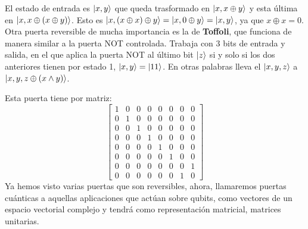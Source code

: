 \documentclass[a4paper]{article}
\numberwithin{equation}{section}
\begin{document}
\begin{figure}[h]
\centering
{}
\end{figure}

El estado de entrada es $\ket{x, y}$ que queda trasformado en $\ket{x, x\oplus y}$ y esta última en $\ket{x, x\oplus (x\oplus y)}$. Esto es $\ket{x, (x\oplus x) \oplus y} = \ket{x, 0\oplus y} = \ket{x, y}$, ya que $x\oplus x = 0$.\\
\linebreak
Otra puerta reversible de mucha importancia es la de \textbf{Toffoli},
que funciona de manera similar a la puerta NOT controlada. Trabaja con 3 bits de entrada y salida, en el que aplica la puerta NOT al último bit $\ket{z}$ si y solo si los dos anteriores tienen por estado 1, $\ket{x, y} = \ket{11}$. En otras palabras lleva el $\ket{x,y,z}$ a $\ket{x,y,z\oplus(x\wedge y)}$. \\
\begin{figure}[h]
\centering
{}
\end{figure}

Esta puerta tiene por matriz:
\begin{equation}
\begin{bmatrix}
1 & 0 & 0 & 0 & 0 & 0 & 0 & 0 \\
0 & 1 & 0 & 0 & 0 & 0 & 0 & 0 \\
0 & 0 & 1 & 0 & 0 & 0 & 0 & 0 \\
0 & 0 & 0 & 1 & 0 & 0 & 0 & 0 \\
0 & 0 & 0 & 0 & 1 & 0 & 0 & 0 \\
0 & 0 & 0 & 0 & 0 & 1 & 0 & 0 \\
0 & 0 & 0 & 0 & 0 & 0 & 0 & 1 \\
0 & 0 & 0 & 0 & 0 & 0 & 1 & 0
\end{bmatrix}
\end{equation}
Ya hemos visto varias puertas que son reversibles, ahora, llamaremos puertas cuánticas a aquellas aplicaciones que actúan sobre qubits, como vectores de un espacio vectorial complejo y tendrá como representación matricial, matrices unitarias.\\
\end{document}
